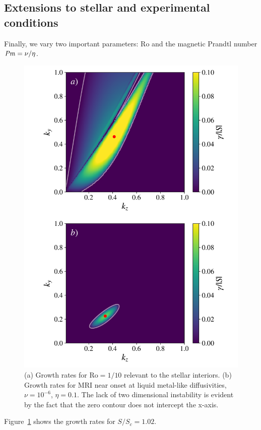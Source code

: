\documentclass[openacc]{rsproca_new}%
\newcommand{\SSC}{S/S_{c}}
\newcommand{\Prm}{\mbox{\textit{Pm}}}
\newcommand{\Ro}{\mathrm{Ro}}
\begin{document}
\subsection{Extensions to stellar and experimental conditions}
\label{sec:extensions}

Finally, we vary two important parameters:
$\Ro$ and the magnetic Prandtl number $\Prm=\nu/\eta$.
\begin{figure}[h!]
  \centering
  \includegraphics[width=\columnwidth]{low_rossby_liquid_metal_growth_rates.pdf}
  \caption{(a) Growth rates for $\Ro=1/10$ relevant to the stellar interiors. 
  (b) Growth rates for MRI near onset at liquid metal-like diffusivities, $\nu=10^{-6}$, $\eta=0.1$.
The lack of two dimensional instability is evident by the fact that the zero contour does not intercept the x-axis.}
  \label{fig:other_params}
\end{figure}
Figure~\ref{fig:other_params} shows the growth rates for $\SSC=1.02$.
\end{document}
